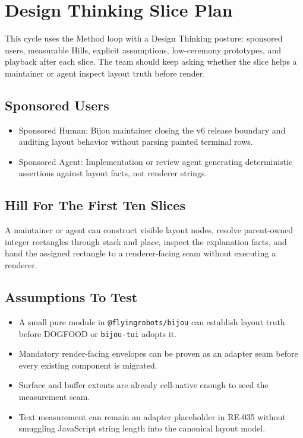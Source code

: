 \section{Design Thinking Slice Plan}\label{record-163-design-thinking-slice-plan}

This cycle uses the Method loop with a Design Thinking posture: sponsored users, measurable Hills, explicit assumptions, low-ceremony prototypes, and playback after each slice. The team should keep asking whether the slice helps a maintainer or agent inspect layout truth before render.

\subsection{Sponsored Users}\label{record-163-sponsored-users}

\begin{itemize}
\tightlist
\item
  Sponsored Human: Bijou maintainer closing the v6 release boundary and auditing layout behavior without parsing painted terminal rows.
\item
  Sponsored Agent: Implementation or review agent generating deterministic assertions against layout facts, not renderer strings.
\end{itemize}

\subsection{Hill For The First Ten Slices}\label{record-163-hill-for-the-first-ten-slices}

A maintainer or agent can construct visible layout nodes, resolve parent-owned integer rectangles through stack and place, inspect the explanation facts, and hand the assigned rectangle to a renderer-facing seam without executing a renderer.

\subsection{Assumptions To Test}\label{record-163-assumptions-to-test}

\begin{itemize}
\tightlist
\item
  A small pure module in \texttt{@\allowbreak{}f\allowbreak{}l\allowbreak{}y\allowbreak{}i\allowbreak{}n\allowbreak{}g\allowbreak{}r\allowbreak{}o\allowbreak{}b\allowbreak{}o\allowbreak{}t\allowbreak{}s\allowbreak{}/\allowbreak{}b\allowbreak{}i\allowbreak{}j\allowbreak{}o\allowbreak{}u} can establish layout truth before DOGFOOD or \texttt{b\allowbreak{}i\allowbreak{}j\allowbreak{}o\allowbreak{}u\allowbreak{}-\allowbreak{}t\allowbreak{}u\allowbreak{}i} adopts it.
\item
  Mandatory render-facing envelopes can be proven as an adapter seam before every existing component is migrated.
\item
  Surface and buffer extents are already cell-native enough to seed the measurement seam.
\item
  Text measurement can remain an adapter placeholder in RE-035 without smuggling JavaScript string length into the canonical layout model.
\end{itemize}

